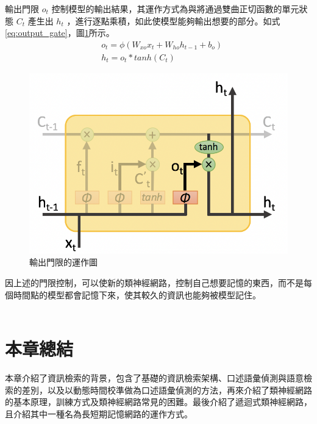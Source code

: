 \begin{itemize}
輸出門限 $ o_t $ 控制模型的輸出結果，其運作方式為與將通過雙曲正切函數的單元狀態 $ C_t $ 產生出 $ h_t $ ，進行逐點乘積，如此使模型能夠輸出想要的部分。如式\ref{eq:output_gate}，圖\ref{fig:ch2_output_gate}所示。
\begin{equation}
\label{eq:output_gate}
	\begin{aligned}
		&o_t = \phi (W_{xo} x_t +W_{ho} h_{t-1} +b_o)
		\\
		&h_t = o_t * tanh(C_t)
	\end{aligned}
\end{equation}
\begin{figure}[ht]
\centering
\includegraphics[scale=0.5]{images/ch2_output_gate.png}
\caption{輸出門限的運作圖\cite{shen2016}} \label{fig:ch2_output_gate}
\end{figure}
\end{itemize}

因上述的門限控制，可以使新的類神經網路，控制自己想要記憶的東西，而不是每個時間點的模型都會記憶下來，使其較久的資訊也能夠被模型記住。
\\
\\

\section{本章總結}
本章介紹了資訊檢索的背景，包含了基礎的資訊檢索架構、口述語彙偵測與語意檢索的差別，以及以動態時間校準做為口述語彙偵測的方法，再來介紹了類神經網路的基本原理，訓練方式及類神經網路常見的困難。最後介紹了遞迴式類神經網路，且介紹其中一種名為長短期記憶網路的運作方式。
